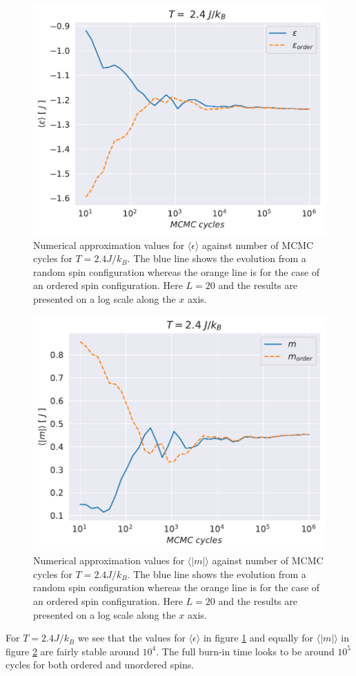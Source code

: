 \documentclass[english,notitlepage,reprint,nofootinbib]{revtex4-1}  %
\begin{document}
\begin{figure}[H]
    \centering
    \includegraphics[width=.5\textwidth]{../figures/numeric_L_20_T_2_4_e.pdf}
    \caption{Numerical approximation values for $\langle \epsilon \rangle$ against number of MCMC cycles for $T=2.4 J/k_B$. The blue line shows the evolution from a random spin configuration whereas the orange line is for the case of an ordered spin configuration. Here $L=20$ and the results are presented on a log scale along the $x$ axis.}
    \label{fig:numeric_L_20_T_2_4_e}
\end{figure}

\begin{figure}[H]
    \centering
    \includegraphics[width=.5\textwidth]{../figures/numeric_L_20_T_2_4_m.pdf}
    \caption{Numerical approximation values for $\langle |m| \rangle$ against number of MCMC cycles for $T=2.4 J/k_B$. The blue line shows the evolution from a random spin configuration whereas the orange line is for the case of an ordered spin configuration. Here $L=20$ and the results are presented on a log scale along the $x$ axis.}
    \label{fig:numeric_L_20_T_2_4_m}
\end{figure}
For $T=2.4J/k_B$ we see that the values for $\langle \epsilon \rangle$ in figure \ref{fig:numeric_L_20_T_2_4_e} and equally for $\langle |m| \rangle$ in figure \ref{fig:numeric_L_20_T_2_4_m} are fairly stable around $10^4$. The full burn-in time looks to be around $10^5$ cycles for both ordered and unordered spins.
\end{document}
